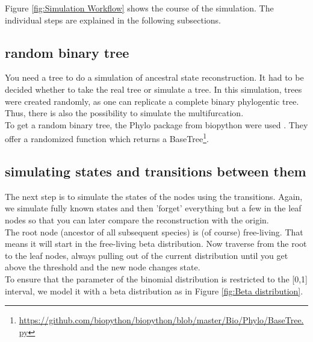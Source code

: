    Figure \ref{fig:Simulation Workflow} shows the course of the simulation. The individual steps are 
      explained in the following subsections.


    \subsection{random binary tree}
      You need a tree to do a simulation of ancestral state reconstruction. It had to be decided whether 
        to take the real tree or simulate a tree. In this simulation, trees were created randomly, as 
        one can replicate a complete binary phylogentic tree. Thus, there is also the possibility to 
        simulate the multifurcation. \\
      
      To get a random binary tree, the Phylo package from biopython were used \cite{Cock2009}. They offer 
        a randomized function which returns a BaseTree\footnote{
          \hyperlink{https://github.com/biopython/biopython/blob/master/Bio/Phylo/BaseTree.py}
          {https://github.com/biopython/biopython/blob/master/Bio/Phylo/BaseTree.py}
        }. \\

    \subsection{simulating states and transitions between them}
      The next step is to simulate the states of the nodes using the transitions. Again, we simulate 
        fully known states and then 'forget' everything but a few in the leaf nodes so that you can 
        later compare the reconstruction with the origin. \\
      The root node (ancestor of all subsequent species) is (of course) free-living. That means it will 
        start in the free-living beta distribution. Now traverse from the root to the leaf nodes, always 
        pulling out of the current distribution until you get above the threshold and the new node 
        changes state. \\
      To ensure that the parameter of the binomial distribution is restricted to the [0,1] interval, we 
        model it with a beta distribution as in Figure \ref{fig:Beta distribution}. \\

